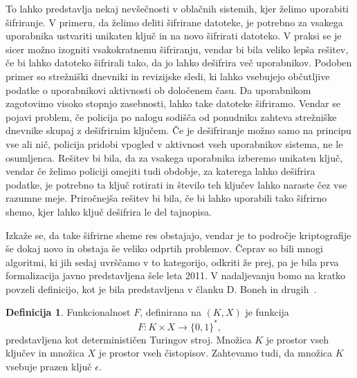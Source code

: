 \documentclass[12pt,a4paper,openany,tikz]{book}
\theoremstyle{plain}
\theoremstyle{definition}
\newtheorem{defn}[thm]{Definicija} %
\begin{document}
To lahko predstavlja nekaj nevšečnosti v oblačnih sistemih, kjer želimo uporabiti šifriranje. V primeru, da želimo deliti šifrirane datoteke, je potrebno za vsakega uporabnika ustvariti unikaten ključ in na novo šifrirati datoteko. V praksi se je sicer možno izogniti vsakokratnemu šifriranju, vendar bi bila veliko lepša rešitev, če bi lahko datoteko šifrirali tako, da jo lahko dešifrira več uporabnikov. Podoben primer so strežniški dnevniki in revizijske sledi, ki lahko vsebujejo občutljive podatke o uporabnikovi aktivnosti ob določenem času. Da uporabnikom zagotovimo visoko stopnjo zasebnosti, lahko take datoteke šifriramo. Vendar se pojavi problem, če policija po nalogu sodišča od ponudnika zahteva strežniške dnevnike skupaj z dešifrirnim ključem. Če je dešifriranje možno samo na principu vse ali nič, policija pridobi vpogled v aktivnost vseh uporabnikov sistema, ne le osumljenca. Rešitev bi bila, da za vsakega uporabnika izberemo unikaten ključ, vendar če želimo policiji omejiti tudi obdobje, za katerega lahko dešifrira podatke, je potrebno ta ključ rotirati in število teh ključev lahko naraste čez vse razumne meje. Priročnejša rešitev bi bila, če bi lahko uporabili tako šifrirno shemo, kjer lahko ključ dešifrira le del tajnopisa.

Izkaže se, da take šifrirne sheme res obstajajo, vendar je to področje kriptografije še dokaj novo in obstaja še veliko odprtih problemov. Čeprav so bili mnogi algoritmi, ki jih sedaj uvrščamo v to kategorijo, odkriti že prej, pa je bila prva formalizacija javno predstavljena šele leta 2011. V nadaljevanju bomo na kratko povzeli definicijo, kot je bila predstavljena v članku D. Boneh in drugih~\cite{boneh2011functional}.

\begin{mdframed}[frametitle={Funkcionalnost}]
\begin{defn}
Funkcionalnost $F$, definirana na $(K, X)$ je funkcija $$F: K \times X \rightarrow {\{}0,1{\}}^*,$$ predstavljena kot determinističen Turingov stroj. Množica $K$ je prostor vseh ključev in množica $X$ je prostor vseh čistopisov. Zahtevamo tudi, da množica $K$ vsebuje prazen ključ $\epsilon$.
\label{def:functionality}
\end{defn}
\end{mdframed}
\end{document}
